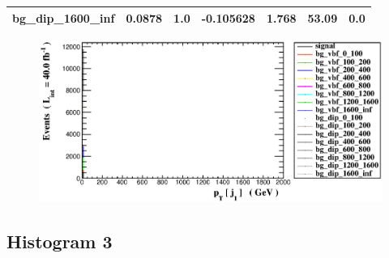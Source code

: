 \documentclass[a4paper, 10pt]{article}
\begin{document}
\begin{table}[H]
\begin{center}
\begin{tabular}{|m{23.0mm}|m{23.0mm}|m{18.0mm}|m{19.0mm}|m{19.0mm}|m{19.0mm}|m{19.0mm}|}
      \hline
      {\cellcolor{white}         bg\_dip\_1600\_inf}& {\cellcolor{white}         0.0878}& {\cellcolor{white}         1.0}& {\cellcolor{white}         -0.105628}& {\cellcolor{white}         1.768}& {\cellcolor{red}         53.09}& {\cellcolor{red}         0.0}\\
\hline
    \end{tabular}
  \end{center}
\end{table}

\begin{figure}[H]
  \begin{center}
    \includegraphics[scale=0.45]{selection_1.eps}\\
\caption{   }
  \end{center}
\end{figure}
      \newpage
\subsection{ Histogram 3}
\end{document}
